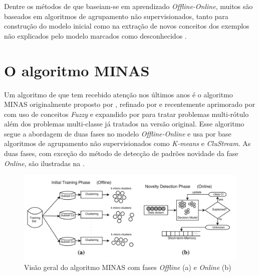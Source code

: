 Dentre os métodos de \nd que baseiam-se em aprendizado \emph{Offline-Online},
muitos são baseados em algoritmos de agrupamento não supervisionados, tanto
para construção do modelo inicial como na extração de novos conceitos dos
exemplos não explicados pelo modelo marcados como desconhecidos
\cite{Spinosa2009ollinda,Masud2010ECSMiner,Faria2013}.





\section{O algoritmo MINAS}\label{sec:minas-og}

Um algoritmo de \nd que tem recebido atenção nos últimos anos é o algoritmo
MINAS originalmente proposto por , refinado por
 e recentemente aprimorado por
 com uso de conceitos \emph{Fuzzy} e expandido por
 para tratar problemas multi-rótulo além dos problemas
multi-classe já tratados na versão original.
Esse algoritmo segue a abordagem de duas fases no modelo \emph{Offline-Online} e
usa por base algoritmos de agrupamento não supervisionados como \emph{K-means} e
\emph{CluStream}.
As duas fases, com exceção do método de detecção de padrões novidade da fase
\emph{Online}, são ilustradas na .

\begin{figure}[ht]
\centering
\includegraphics[width=1\textwidth]{figuras/FariaMinas2015-fases.png}
\caption{Visão geral do algoritmo MINAS com fases \emph{Offline} (a) e 
\emph{Online} (b) \cite{Faria2016minas}}
\label{fig:minas}
\end{figure}

